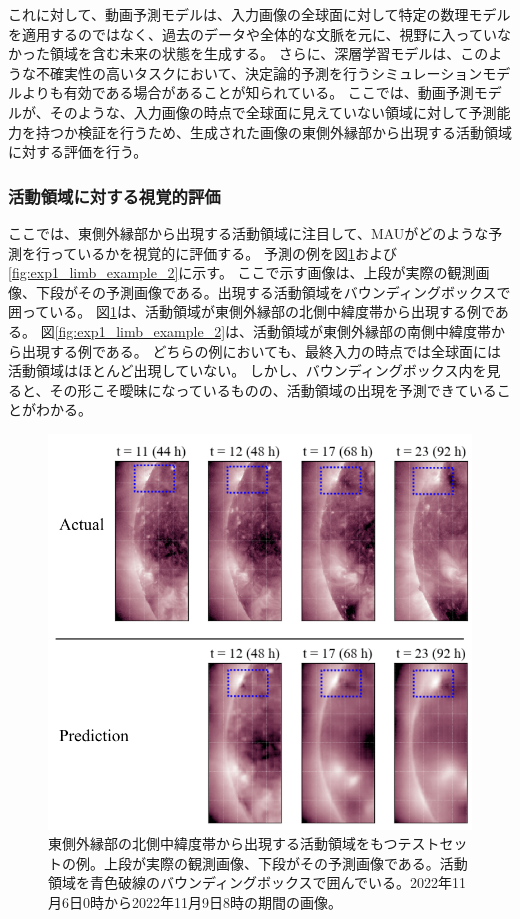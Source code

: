       これに対して、動画予測モデルは、入力画像の全球面に対して特定の数理モデルを適用するのではなく、過去のデータや全体的な文脈を元に、視野に入っていなかった領域を含む未来の状態を生成する。
      さらに、深層学習モデルは、このような不確実性の高いタスクにおいて、決定論的予測を行うシミュレーションモデルよりも有効である場合があることが知られている。
      ここでは、動画予測モデルが、そのような、入力画像の時点で全球面に見えていない領域に対して予測能力を持つか検証を行うため、生成された画像の東側外縁部から出現する活動領域に対する評価を行う。

      \subsubsection{活動領域に対する視覚的評価}
        ここでは、東側外縁部から出現する活動領域に注目して、MAUがどのような予測を行っているかを視覚的に評価する。
        予測の例を図\ref{fig:exp1_limb_example_1}および\ref{fig:exp1_limb_example_2}に示す。
        ここで示す画像は、上段が実際の観測画像、下段がその予測画像である。出現する活動領域をバウンディングボックスで囲っている。
        図\ref{fig:exp1_limb_example_1}は、活動領域が東側外縁部の北側中緯度帯から出現する例である。
        図\ref{fig:exp1_limb_example_2}は、活動領域が東側外縁部の南側中緯度帯から出現する例である。
        どちらの例においても、最終入力の時点では全球面には活動領域はほとんど出現していない。
        しかし、バウンディングボックス内を見ると、その形こそ曖昧になっているものの、活動領域の出現を予測できていることがわかる。
        \begin{figure}[htbp]
          \centering
          \includegraphics[width=\textwidth]{figures/exp1/limb_sample_3_caption.jpg}
          \caption{東側外縁部の北側中緯度帯から出現する活動領域をもつテストセットの例。上段が実際の観測画像、下段がその予測画像である。活動領域を青色破線のバウンディングボックスで囲んでいる。2022年11月6日0時から2022年11月9日8時の期間の画像。}
          \label{fig:exp1_limb_example_1}
        \end{figure}
